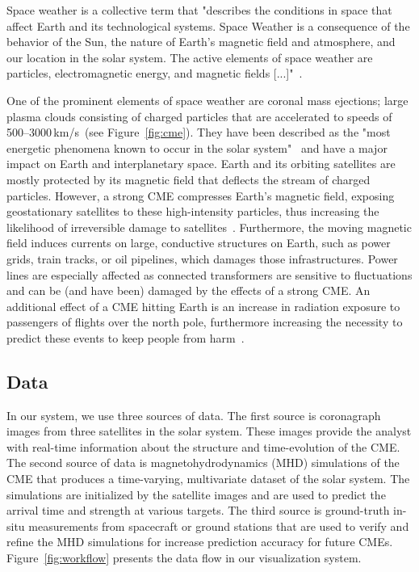\documentclass[journal]{vgtc}                %
\begin{document}
Space weather is a collective term that "describes the conditions in space that affect Earth and its technological systems. Space Weather is a consequence of the behavior of the Sun, the nature of Earth’s magnetic field and atmosphere, and our location in the solar system. The active elements of space weather are particles, electromagnetic energy, and magnetic fields [...]"~\cite{noaaprofile}.

One of the prominent elements of space weather are coronal mass ejections; large plasma clouds consisting of charged particles that are accelerated to speeds of 500--3000\,km/s~(see Figure~\ref{fig:cme}). They have been described as the "most energetic phenomena known to occur in the solar system"~\cite{Kahler:1987jt} and have a major impact on Earth and interplanetary space. Earth and its orbiting satellites are mostly protected by its magnetic field that deflects the stream of charged particles. However, a strong CME compresses Earth's magnetic field, exposing geostationary satellites to these high-intensity particles, thus increasing the likelihood of irreversible damage to satellites~\cite{Guhathakurta:2013cl}. Furthermore, the moving magnetic field induces currents on large, conductive structures on Earth, such as power grids, train tracks, or oil pipelines, which damages those infrastructures. Power lines are especially affected as connected transformers are sensitive to fluctuations and can be (and have been) damaged by the effects of a strong CME. An additional effect of a CME hitting Earth is an increase in radiation exposure to passengers of flights over the north pole, furthermore increasing the necessity to predict these events to keep people from harm~\cite{Matthia:2009en}.

\subsection{Data} \label{sec:data}
In our system, we use three sources of data. The first source is coronagraph images from three satellites in the solar system. These images provide the analyst with real-time information about the structure and time-evolution of the CME. The second source of data is magnetohydrodynamics (MHD) simulations of the CME that produces a time-varying, multivariate dataset of the solar system. The simulations are initialized by the satellite images and are used to predict the arrival time and strength at various targets. The third source is ground-truth in-situ measurements from spacecraft or ground stations that are used to verify and refine the MHD simulations for increase prediction accuracy for future CMEs. Figure~\ref{fig:workflow} presents the data flow in our visualization system.
\end{document}
